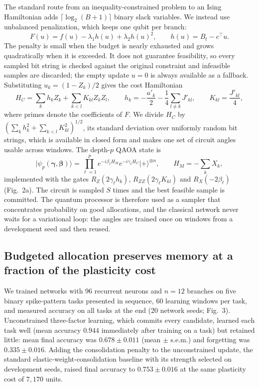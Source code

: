 The standard route from an inequality-constrained problem to an Ising Hamiltonian adds $\lceil\log_{2}(B+1)\rceil$ binary slack variables\cite{lucas2014}. We instead use unbalanced penalization\cite{montanez2024}, which keeps one qubit per branch:
\begin{equation}
F(u)=f(u)-\lambda_{1}h(u)+\lambda_{2}h(u)^{2},\qquad h(u)=B_{t}-c^{\top}u .
\label{eq:unbalanced}
\end{equation}
The penalty is small when the budget is nearly exhausted and grows quadratically when it is exceeded. It does not guarantee feasibility, so every sampled bit string is checked against the original constraint and infeasible samples are discarded; the empty update $u=0$ is always available as a fallback. Substituting $u_{k}=(1-Z_{k})/2$ gives the cost Hamiltonian
\begin{equation}
H_{C}=\sum_{k}h_{k}Z_{k}+\sum_{k<l}K_{kl}Z_{k}Z_{l},\qquad h_{k}=-\frac{a'_{k}}{2}-\frac{1}{4}\sum_{l\neq k}J'_{kl},\qquad K_{kl}=\frac{J'_{kl}}{4},
\label{eq:ising}
\end{equation}
where primes denote the coefficients of $F$. We divide $H_{C}$ by $(\sum_{k}h_{k}^{2}+\sum_{k<l}K_{kl}^{2})^{1/2}$, its standard deviation over uniformly random bit strings, which is available in closed form and makes one set of circuit angles usable across windows. The depth-$p$ QAOA state\cite{farhi2014} is
\begin{equation}
\lvert\psi_{p}(\boldsymbol\gamma,\boldsymbol\beta)\rangle=\prod_{\ell=1}^{p}e^{-i\beta_{\ell}H_{M}}e^{-i\gamma_{\ell}H_{C}}\lvert+\rangle^{\otimes n},\qquad H_{M}=-\sum_{k}X_{k},
\label{eq:qaoa}
\end{equation}
implemented with the gates $R_{Z}(2\gamma_{\ell}h_{k})$, $R_{ZZ}(2\gamma_{\ell}K_{kl})$ and $R_{X}(-2\beta_{\ell})$ (Fig.~2a). The circuit is sampled $S$ times and the best feasible sample is committed. The quantum processor is therefore used as a sampler that concentrates probability on good allocations, and the classical network never waits for a variational loop: the angles are trained once on windows from a development seed and then reused.

\subsection*{Budgeted allocation preserves memory at a fraction of the plasticity cost}

We trained networks with 96 recurrent neurons and $n=12$ branches on five binary spike-pattern tasks presented in sequence, 60 learning windows per task, and measured accuracy on all tasks at the end (20 network seeds; Fig.~3). Unconstrained three-factor learning, which commits every candidate, learned each task well (mean accuracy $0.944$ immediately after training on a task) but retained little: mean final accuracy was $0.678\pm0.011$ (mean $\pm$ s.e.m.) and forgetting was $0.335\pm0.016$. Adding the consolidation penalty to the unconstrained update, the standard elastic-weight-consolidation baseline with its strength selected on development seeds, raised final accuracy to $0.753\pm0.016$ at the same plasticity cost of $7{,}170$ units.

